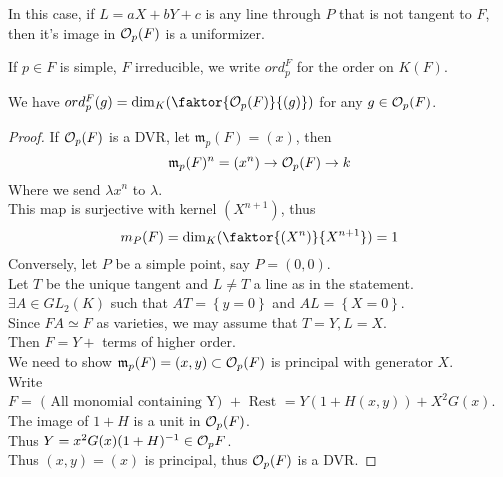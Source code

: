 \documentclass[../main.tex]{subfiles}
\begin{document}
In this case, if $L= aX + bY +c$ is any line through $P$ that is not tangent to $F$, then it's image in $\mathcal{O}_p( F) $ is a uniformizer.
\begin{defn}
	If $p \in F$ is simple, $F$ irreducible, we write $ord_p^{F}$ for the order on $K( F) $.	
\end{defn}
We have $ ord_p^{F}( g) = \dim_K ( \faktor { \O_p( F) } { ( g) } ) $ for any $g\in \mathcal{O}_p( F) $.
\begin{proof}
If $\mathcal{O}_p( F) $ is a DVR, let $\mathfrak m _p( F)= ( x)  $, then
\[ 
\mathfrak { m} _p( F)^{n}= ( x^{n}) \to \mathcal{O}_p( F) \to k
\]
Where we send $\lambda x^{n}$ to $\lambda$.\\
This map is surjective with kernel $( X^{n+1})$, thus
\[ 
	m_P( F) = \dim_K ( \faktor { ( X^{n}) }{ X^{n+1}} ) =1
\]
Conversely, let $P$ be a simple point, say $P=( 0,0) $.\\
Let $T$ be the unique tangent and $L\neq T$ a line as in the statement.\\
$\exists A\in GL_2( K) $ such that $AT = \left\{ y=0 \right\} $ and $AL = \left\{ X=0 \right\} $.\\
Since $FA \simeq F$ as varieties, we may assume that $T=Y, L=X$.\\
Then $F= Y + $ terms of higher order.\\
We need to show $\mathfrak{m}_p( F) = ( x,y) \subset \mathcal{O}_p( F) $ is principal with generator $X$.\\
Write $F= \text{ ( All monomial containing Y)  } + \text{ Rest } = Y( 1+ H( x,y) ) + X^{2} G( x) $.\\
The image of $1+H$ is a unit in $\mathcal{O}_p( F) $.\\
Thus $Y= x^{2} G( x) ( 1+H)^{-1}\in \mathcal{O}_pF$.\\
Thus $( x,y) = ( x) $ is principal, thus $\mathcal{O}_p( F) $ is a DVR.

\end{proof}
\end{document}
